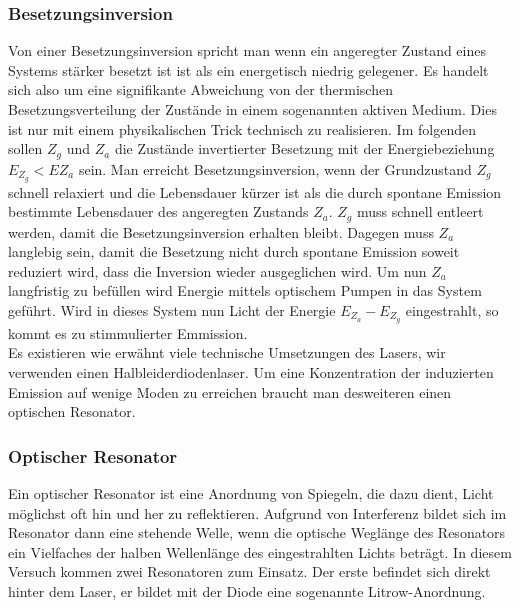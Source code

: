 \documentclass[12pt]{article}
\begin{document}
\subsubsection{Besetzungsinversion}
Von einer Besetzungsinversion spricht man wenn ein angeregter Zustand eines Systems stärker besetzt ist ist als ein energetisch niedrig gelegener. Es handelt sich also um eine signifikante Abweichung von der thermischen Besetzungsverteilung der Zustände in einem sogenannten aktiven Medium. Dies ist nur mit einem physikalischen Trick technisch zu realisieren.
Im folgenden sollen $Z_g$ und $Z_a$ die Zustände invertierter Besetzung mit der Energiebeziehung $E_{Z_g}<E{Z_a}$ sein.
Man erreicht Besetzungsinversion, wenn der Grundzustand $Z_g$ schnell relaxiert und die Lebensdauer kürzer ist als die durch spontane Emission bestimmte Lebensdauer des angeregten  Zustands $Z_a$. $Z_g$ muss schnell entleert werden, damit die Besetzungsinversion erhalten bleibt. Dagegen muss $Z_a$ langlebig sein, damit die Besetzung nicht durch spontane Emission soweit reduziert wird, dass die Inversion wieder ausgeglichen wird. Um nun $Z_a$ langfristig zu befüllen wird Energie mittels optischem Pumpen in das System geführt. Wird in dieses System nun Licht der Energie $E_{Z_a}-E_{Z_g}$ eingestrahlt, so kommt es zu stimmulierter Emmission.\\
Es existieren wie erwähnt viele technische Umsetzungen des Lasers, wir verwenden einen Halbleiderdiodenlaser.
Um eine Konzentration der induzierten Emission auf wenige Moden zu erreichen braucht man desweiteren einen optischen Resonator.

\subsubsection{Optischer Resonator}
Ein optischer Resonator ist eine Anordnung von Spiegeln, die dazu dient, Licht möglichst oft hin und her zu reflektieren. Aufgrund von Interferenz bildet sich im Resonator dann eine stehende Welle, wenn die optische Weglänge des Resonators ein Vielfaches der halben Wellenlänge des eingestrahlten Lichts beträgt. In diesem Versuch kommen zwei Resonatoren zum Einsatz. Der erste befindet sich direkt hinter dem Laser, er bildet mit der Diode eine sogenannte Litrow-Anordnung.
\end{document}
